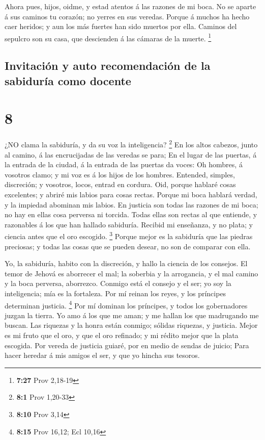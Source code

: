  Ahora pues, hijos, oidme, y estad atentos á las razones de
mi boca.  No se aparte á sus caminos tu corazón; no yerres
en sus veredas.  Porque á muchos ha hecho caer heridos; y
aun los más fuertes han sido muertos por ella.  Caminos del
sepulcro son su casa, que descienden á las cámaras de la muerte.
\footnote{\textbf{7:27} Prov 2,18-19}

\hypertarget{invitaciuxf3n-y-auto-recomendaciuxf3n-de-la-sabiduruxeda-como-docente}{%
\subsection{Invitación y auto recomendación de la sabiduría como
docente}\label{invitaciuxf3n-y-auto-recomendaciuxf3n-de-la-sabiduruxeda-como-docente}}

\hypertarget{section-7}{%
\section{8}\label{section-7}}

 ¿NO clama la sabiduría, y da su voz la inteligencia?
\footnote{\textbf{8:1} Prov 1,20-33}  En los altos cabezos,
junto al camino, á las encrucijadas de las veredas se para; 
En el lugar de las puertas, á la entrada de la ciudad, á la entrada de
las puertas da voces:  Oh hombres, á vosotros clamo; y mi
voz es á los hijos de los hombres.  Entended, simples,
discreción; y vosotros, locos, entrad en cordura.  Oid,
porque hablaré cosas excelentes; y abriré mis labios para cosas rectas.
 Porque mi boca hablará verdad, y la impiedad abominan mis
labios.  En justicia son todas las razones de mi boca; no
hay en ellas cosa perversa ni torcida.  Todas ellas son
rectas al que entiende, y razonables á los que han hallado sabiduría.
 Recibid mi enseñanza, y no plata; y ciencia antes que el
oro escogido. \footnote{\textbf{8:10} Prov 3,14}  Porque
mejor es la sabiduría que las piedras preciosas; y todas las cosas que
se pueden desear, no son de comparar con ella.

 Yo, la sabiduría, habito con la discreción, y hallo la
ciencia de los consejos.  El temor de Jehová es aborrecer
el mal; la soberbia y la arrogancia, y el mal camino y la boca perversa,
aborrezco.  Conmigo está el consejo y el ser; yo soy la
inteligencia; mía es la fortaleza.  Por mí reinan los
reyes, y los príncipes determinan justicia. \footnote{\textbf{8:15} Prov
  16,12; Ecl 10,16}  Por mí dominan los príncipes, y todos
los gobernadores juzgan la tierra.  Yo amo á los que me
aman; y me hallan los que madrugando me buscan.  Las
riquezas y la honra están conmigo; sólidas riquezas, y justicia.
 Mejor es mi fruto que el oro, y que el oro refinado; y mi
rédito mejor que la plata escogida.  Por vereda de justicia
guiaré, por en medio de sendas de juicio;  Para hacer
heredar á mis amigos el ser, y que yo hincha sus tesoros.

